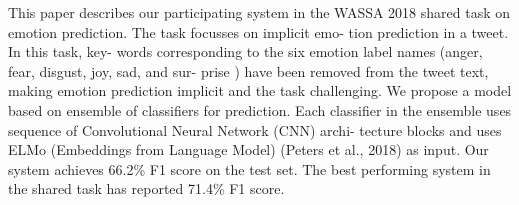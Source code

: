 This paper describes our participating system in the WASSA 2018 shared task on emotion prediction. The task focusses on implicit emo- tion prediction in a tweet. In this task, key- words corresponding to the six emotion label names (anger, fear, disgust, joy, sad, and sur- prise ) have been removed from the tweet text, making emotion prediction implicit and the task challenging. We propose a model based on ensemble of classifiers for prediction. Each classifier in the ensemble uses sequence of Convolutional Neural Network (CNN) archi- tecture blocks and uses ELMo (Embeddings from Language Model) (Peters et al., 2018) as input. Our system achieves 66.2\% F1 score on the test set. The best performing system in the shared task has reported 71.4\% F1 score.
